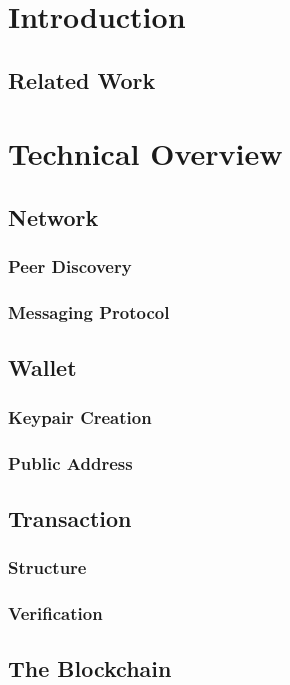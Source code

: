 \documentclass{article}
\begin{document}
\section{Introduction}
\subsection{Related Work}

\section{Technical Overview}
\subsection{Network}
\subsubsection{Peer Discovery}
\subsubsection{Messaging Protocol}

\subsection{Wallet}
\subsubsection{Keypair Creation}
\subsubsection{Public Address}

\subsection{Transaction}
\subsubsection{Structure}
\subsubsection{Verification}

\subsection{The Blockchain}
\end{document}
